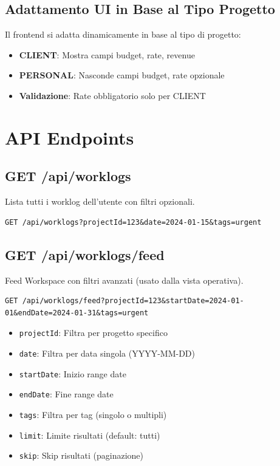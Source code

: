 \documentclass[11pt,a4paper]{article}
\begin{document}
\subsection{Adattamento UI in Base al Tipo Progetto}

Il frontend si adatta dinamicamente in base al tipo di progetto:

\begin{itemize}
    \item \textbf{CLIENT}: Mostra campi budget, rate, revenue
    \item \textbf{PERSONAL}: Nasconde campi budget, rate opzionale
    \item \textbf{Validazione}: Rate obbligatorio solo per CLIENT
\end{itemize}

\section{API Endpoints}

\subsection{GET /api/worklogs}

Lista tutti i worklog dell'utente con filtri opzionali.

\begin{lstlisting}[caption=Query Parameters]
GET /api/worklogs?projectId=123&date=2024-01-15&tags=urgent
\end{lstlisting}

\subsection{GET /api/worklogs/feed}

Feed Workspace con filtri avanzati (usato dalla vista operativa).

\begin{lstlisting}[caption=Feed Parameters]
GET /api/worklogs/feed?projectId=123&startDate=2024-01-01&endDate=2024-01-31&tags=urgent
\end{lstlisting}

\begin{itemize}
    \item \texttt{projectId}: Filtra per progetto specifico
    \item \texttt{date}: Filtra per data singola (YYYY-MM-DD)
    \item \texttt{startDate}: Inizio range date
    \item \texttt{endDate}: Fine range date
    \item \texttt{tags}: Filtra per tag (singolo o multipli)
    \item \texttt{limit}: Limite risultati (default: tutti)
    \item \texttt{skip}: Skip risultati (paginazione)
\end{itemize}
\end{document}
